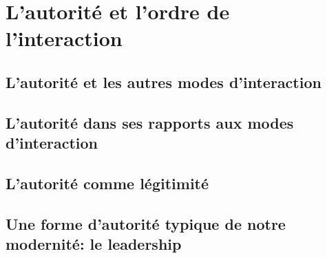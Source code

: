 \documentclass[11pt]{article} %
\begin{document}
\section{L'autorité et l'ordre de l'interaction}
	\subsection{L'autorité et les autres modes d'interaction}
	\subsection{L'autorité dans ses rapports aux modes d'interaction}
	\subsection{L'autorité comme légitimité}
	\subsection{Une forme d'autorité typique de notre modernité: le leadership}
	

	
	
\end{document}
